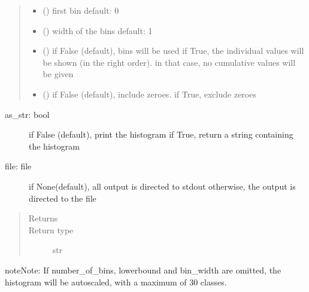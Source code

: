 \documentclass[letterpaper,10pt,english]{sphinxmanual}
\begin{document}
\begin{fulllineitems}
\begin{fulllineitems}
\begin{quote}
\begin{description}
\begin{itemize}
\item {} 
 () \textendash{} first bin 
default: 0

\item {} 
 () \textendash{} width of the bins 
default: 1

\item {} 
 () \textendash{} if False (default), bins will be used 
if True, the individual values will be shown (in the right order).
in that case, no cumulative values will be given 

\item {} 
 () \textendash{} if False (default), include zeroes. if True, exclude zeroes

\end{itemize}

\end{description}\end{quote}
\begin{description}
\item[{as\_str: bool}] \leavevmode
if False (default), print the histogram
if True, return a string containing the histogram

\item[{file: file}] \leavevmode
if None(default), all output is directed to stdout 
otherwise, the output is directed to the file

\end{description}
\begin{quote}\begin{description}
\item[{Returns}] \leavevmode
{}

\item[{Return type}] \leavevmode
str

\end{description}\end{quote}

\begin{sphinxadmonition}{note}{Note:}
If number\_of\_bins, lowerbound and bin\_width are omitted, the histogram will be autoscaled,
with a maximum of 30 classes.
\end{sphinxadmonition}


\end{fulllineitems}
\end{fulllineitems}
\end{document}
